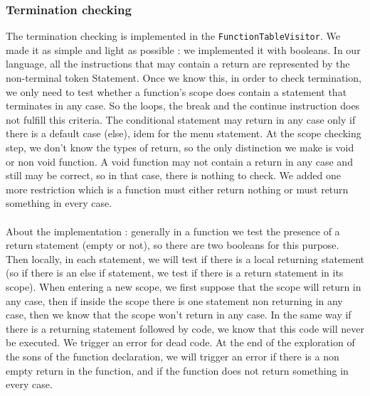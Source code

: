 \documentclass[a4paper,11pt]{article}
\begin{document}
\subsubsection{Termination checking}
The termination checking is implemented in the \texttt{FunctionTableVisitor}. We made it as simple and light as possible : we implemented it with booleans. In our language, all the instructions that may contain a return are represented by the non-terminal token Statement. Once we know this, in order to check termination, we only need to test whether a function's scope does contain a statement that terminates in any case. So the loops, the break and the continue instruction does not fulfill this criteria. The conditional statement may return in any case only if there is a default case (else), idem for the menu statement. At the scope checking step, we don't know the types of return, so the only distinction we make is void or non void function. A void function may not contain a return in any case and still may be correct, so in that case, there is nothing to check. We added one more restriction which is a function must either return nothing or must return something in every case. 
\paragraph{}
About the implementation : generally in a function we test the presence of a return statement (empty or not), so there are two booleans for this purpose. Then locally, in each statement, we will test if there is a local returning statement (so if there is an else if statement, we test if there is a return statement in its scope). When entering a new scope, we first suppose that the scope will return in any case, then if inside the scope there is one statement non returning in any case, then we know that the scope won't return in any case. In the same way if there is a returning statement followed by code, we know that this code will never be executed. We trigger an error for dead code.  At the end of the exploration of the sons of the function declaration, we will trigger an error if there is a non empty return in the function, and if the function does not return something in every case. 
\end{document}
